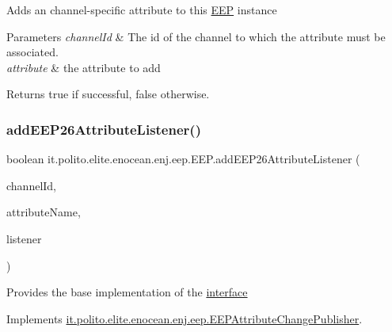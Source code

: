 Adds an channel-\/specific attribute to this \hyperlink{classit_1_1polito_1_1elite_1_1enocean_1_1enj_1_1eep_1_1_e_e_p}{E\+EP} instance


\begin{DoxyParams}{Parameters}
{\em channel\+Id} & The id of the channel to which the attribute must be associated. \\
\hline
{\em attribute} & the attribute to add \\
\hline
\end{DoxyParams}
\begin{DoxyReturn}{Returns}
true if successful, false otherwise. 
\end{DoxyReturn}
\hypertarget{classit_1_1polito_1_1elite_1_1enocean_1_1enj_1_1eep_1_1_e_e_p_a85a1b0ed3a14e033414942ce9c05e268}{}\label{classit_1_1polito_1_1elite_1_1enocean_1_1enj_1_1eep_1_1_e_e_p_a85a1b0ed3a14e033414942ce9c05e268} 
\subsubsection{\texorpdfstring{add\+E\+E\+P26\+Attribute\+Listener()}{addEEP26AttributeListener()}}
{\footnotesize\ttfamily boolean it.\+polito.\+elite.\+enocean.\+enj.\+eep.\+E\+E\+P.\+add\+E\+E\+P26\+Attribute\+Listener (\begin{DoxyParamCaption}\item[{int}]{channel\+Id,  }\item[{String}]{attribute\+Name,  }\item[{\hyperlink{interfaceit_1_1polito_1_1elite_1_1enocean_1_1enj_1_1eep_1_1_e_e_p_attribute_change_listener}{E\+E\+P\+Attribute\+Change\+Listener}}]{listener }\end{DoxyParamCaption})}

Provides the base implementation of the \hyperlink{}{interface }

Implements \hyperlink{interfaceit_1_1polito_1_1elite_1_1enocean_1_1enj_1_1eep_1_1_e_e_p_attribute_change_publisher_a31b54249f260223e3ac6a86b99da482c}{it.\+polito.\+elite.\+enocean.\+enj.\+eep.\+E\+E\+P\+Attribute\+Change\+Publisher}.

\hypertarget{classit_1_1polito_1_1elite_1_1enocean_1_1enj_1_1eep_1_1_e_e_p_ab0145135cf4a16084332a60fb6c9fbaf}{}\label{classit_1_1polito_1_1elite_1_1enocean_1_1enj_1_1eep_1_1_e_e_p_ab0145135cf4a16084332a60fb6c9fbaf} 
